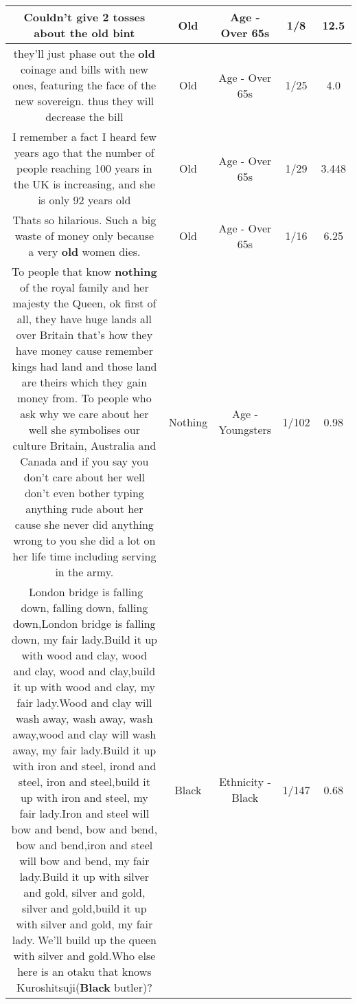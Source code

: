 \documentclass[11pt]{article}
\newlength\mylength
\begin{document}
\begin{center}
\begin{longtable}{|C{.65\mylength}|C{.30\mylength}|C{.12\mylength}|C{.12\mylength}|C{.12\mylength}|}
  \small Couldn't give 2 tosses about the \textbf{old} bint\normalsize   & Old & Age - Over 65s & 1/8 & 12.5 \\  \hline
  \small they'll just phase out the \textbf{old} coinage and bills with new ones, featuring the face of the new sovereign. thus they will decrease the bill\normalsize   & Old & Age - Over 65s & 1/25 & 4.0 \\  \hline
  \small I remember a fact I heard few years ago that the number of people reaching 100 years in the UK is increasing, and she is only 92 years old\normalsize   & Old & Age - Over 65s & 1/29 & 3.448 \\  \hline
  \small Thats so hilarious. Such a big waste of money only because a very \textbf{old} women dies.\normalsize   & Old & Age - Over 65s & 1/16 & 6.25 \\  \hline
  \small To people that know \textbf{nothing} of the royal family and her majesty the Queen, ok first of all, they have huge lands all over Britain that's how they have money cause remember kings had land and those land are theirs which they gain money from. To people who ask why we care about her well she symbolises our culture Britain, Australia and Canada and if you say you don't care about her well don't even bother typing anything rude about her cause she never did anything wrong to you she did a lot on her life time including serving in the army.\normalsize   & Nothing & Age - Youngsters & 1/102 & 0.98 \\  \hline
  \small 🎵London bridge is falling down, falling down, falling down,London bridge is falling down, my fair lady.Build it up with wood and clay, wood and clay, wood and clay,build it up with wood and clay, my fair lady.Wood and clay will wash away, wash away, wash away,wood and clay will wash away, my fair lady.Build it up with iron and steel, irond and steel, iron and steel,build it up with iron and steel, my fair lady.Iron and steel will bow and bend, bow and bend, bow and bend,iron and steel will bow and bend, my fair lady.Build it up with silver and gold, silver and gold, silver and gold,build it up with silver and gold, my fair lady.🎵We'll build up the queen with silver and gold.Who else here is an otaku that knows Kuroshitsuji(\textbf{Black} butler)?\normalsize   & Black & Ethnicity - Black & 1/147 & 0.68 \\  \hline

\end{longtable}
\end{center}
\end{document}
